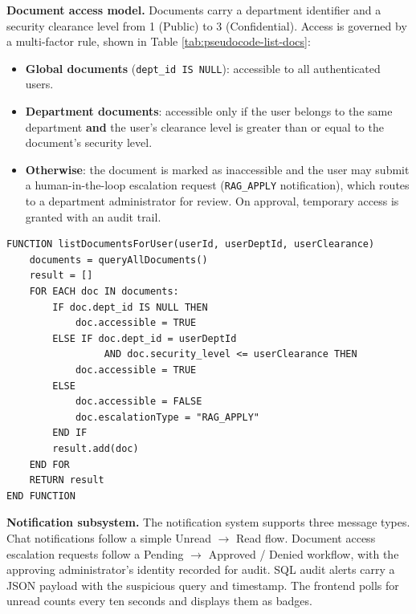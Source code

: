 \textbf{Document access model.} Documents carry a department identifier and a security clearance level from 1 (Public) to 3 (Confidential). Access is governed by a multi-factor rule, shown in Table \ref{tab:pseudocode-list-docs}:

\begin{itemize}
  \item \textbf{Global documents} (\texttt{dept\_id IS NULL}): accessible to all authenticated users.
  \item \textbf{Department documents}: accessible only if the user belongs to the same department \textbf{and} the user's clearance level is greater than or equal to the document's security level.
  \item \textbf{Otherwise}: the document is marked as inaccessible and the user may submit a human-in-the-loop escalation request (\texttt{RAG\_APPLY} notification), which routes to a department administrator for review. On approval, temporary access is granted with an audit trail.
\end{itemize}

\begin{table}[H]
\small\singlespacing
\centering
\caption{Document Access Control Rule --- Pseudocode}
\label{tab:pseudocode-list-docs}
\vspace{2mm}

\begin{lstlisting}
FUNCTION listDocumentsForUser(userId, userDeptId, userClearance)
    documents = queryAllDocuments()
    result = []
    FOR EACH doc IN documents:
        IF doc.dept_id IS NULL THEN
            doc.accessible = TRUE
        ELSE IF doc.dept_id = userDeptId
                 AND doc.security_level <= userClearance THEN
            doc.accessible = TRUE
        ELSE
            doc.accessible = FALSE
            doc.escalationType = "RAG_APPLY"
        END IF
        result.add(doc)
    END FOR
    RETURN result
END FUNCTION
\end{lstlisting}
\end{table}

\textbf{Notification subsystem.} The notification system supports three message types. Chat notifications follow a simple Unread $\rightarrow$ Read flow. Document access escalation requests follow a Pending $\rightarrow$ Approved / Denied workflow, with the approving administrator's identity recorded for audit. SQL audit alerts carry a JSON payload with the suspicious query and timestamp. The frontend polls for unread counts every ten seconds and displays them as badges.

